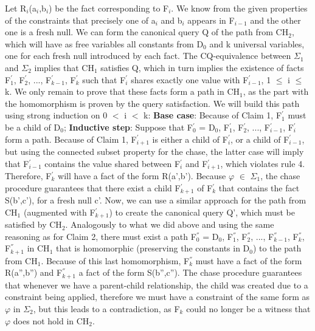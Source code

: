 \documentclass[11pt, a4paper, dvipsnames]{article}
\begin{document}
Let R$_{i}$(a$_{i}$,b$_{i}$) be the fact corresponding to F$_{i}$. We know from the given properties of the constraints that precisely one of a$_{i}$ and b$_{i}$ appears in F$_{i-1}$ and the other one is a fresh null. We can form the canonical query Q of the path from CH$_{2}$, which will have as free variables all constants from D$_{0}$ and k universal variables, one for each fresh null introduced by each fact. The CQ-equivalence between $\Sigma_{1}$ and $\Sigma_{2}$ implies that CH$_{1}$ satisfies Q, which in turn implies the existence of facts F$^{'}_{1}$, F$^{'}_{2}$, ..., F$^{'}_{k-1}$, F$^{'}_{k}$ such that F$^{'}_{i}$ shares exactly one value with F$^{'}_{i-1}$, 1 $\leq$ i $\leq$ k. We only remain to prove that these facts form a path in CH$_{1}$, as the part with the homomorphism is proven by the query satisfaction. We will build this path using strong induction on 0 $<$ i $<$ k:\newline
\textbf{Base case}: Because of Claim 1, F$^{'}_{1}$ must be a child of D$_{0}$;\newline
\textbf{Inductive step}: Suppose that F$^{'}_{0}$ = D$_{0}$, F$^{'}_{1}$, F$^{'}_{2}$, ..., F$^{'}_{i-1}$, F$^{'}_{i}$ form a path. Because of Claim 1, F$^{'}_{i+1}$ is either a child of F$^{'}_{i}$, or a child of F$^{'}_{i-1}$, but using the connected subset property for the chase, the latter case will imply that F$^{'}_{i-1}$ contains the value shared between F$^{'}_{i}$ and F$^{'}_{i+1}$, which violates rule 4.\newline
Therefore, F$^{'}_{k}$ will have a fact of the form R(a',b'). Because $\varphi$ $\in$ $\Sigma_{1}$, the chase procedure guarantees that there exist a child F$^{'}_{k+1}$ of F$^{'}_{k}$ that contains the fact S(b',c'), for a fresh null c'.\newline
Now, we can use a similar approach for the path from CH$_{1}$ (augmented with F$^{'}_{k+1}$) to create the canonical query Q', which must be satisfied by CH$_{2}$. Analogously to what we did above and using the same reasoning as for Claim 2, there must exist a path F$^{''}_{0}$ = D$_{0}$, F$^{''}_{1}$, F$^{''}_{2}$, ..., F$^{''}_{k-1}$, F$^{''}_{k}$, F$^{''}_{k+1}$ in CH$_{1}$ that is homomorphic (preserving the constants in D$_{0}$) to the path from CH$_{1}$.\newline
Because of this last homomorphism, F$^{''}_{k}$ must have a fact of the form R(a'',b'') and F$^{''}_{k+1}$ a fact of the form S(b'',c''). The chase procedure guarantees that whenever we have a parent-child relationship, the child was created due to a constraint being applied, therefore we must have a constraint of the same form as $\varphi$ in $\Sigma_{2}$, but this leads to a contradiction, as F$_{k}$ could no longer be a witness that $\varphi$ does not hold in CH$_{2}$.\newline
\end{document}
